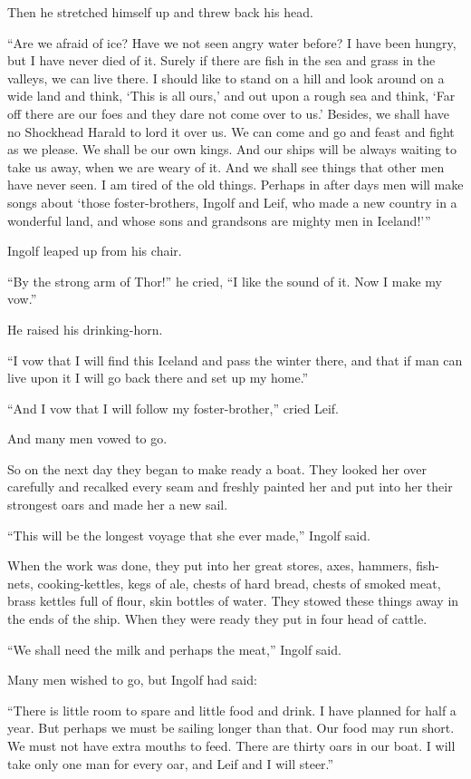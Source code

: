 Then he stretched himself up and threw back his head.

``Are we afraid of ice? Have we not seen angry water before? I have been
hungry, but I have never died of it. Surely if there are fish in the sea
and grass in the valleys, we can live there. I should like to stand on a
hill and look around on a wide land and think, `This is all ours,' and
out upon a rough sea and think, `Far off there are our foes and they
dare not come over to us.' Besides, we shall have no Shockhead Harald to
lord it over us. We can come and go and feast and fight as we please. We
shall be our own kings. And our ships will be always waiting to take us
away, when we are weary of it. And we shall see things that other men
have never seen. I am tired of the old things. Perhaps in after days men
will make songs about `those foster-brothers, Ingolf and Leif, who made
a new country in a wonderful land, and whose sons and grandsons are
mighty men in Iceland!'''

Ingolf leaped up from his chair.

``By the strong arm of Thor!'' he cried, ``I like the sound of it. Now I
make my vow.''

He raised his drinking-horn.

``I vow that I will find this Iceland and pass the winter there, and
that if man can live upon it I will go back there and set up my home.''

``And I vow that I will follow my foster-brother,'' cried Leif.

And many men vowed to go.

So on the next day they began to make ready a boat. They looked her over
carefully and recalked every seam and freshly painted her and put into
her their strongest oars and made her a new sail.

``This will be the longest voyage that she ever made,'' Ingolf said.

When the work was done, they put into her great stores, axes, hammers,
fish-nets, cooking-kettles, kegs of ale, chests of hard bread, chests of
smoked meat, brass kettles full of flour, skin bottles of water. They
stowed these things away in the ends of the ship. When they were ready
they put in four head of cattle.

``We shall need the milk and perhaps the meat,'' Ingolf said.

Many men wished to go, but Ingolf had said:

``There is little room to spare and little food and drink. I have
planned for half a year. But perhaps we must be sailing longer than
that. Our food may run short. We must not have extra mouths to feed.
There are thirty oars in our boat. I will take only one man for every
oar, and Leif and I will steer.''

